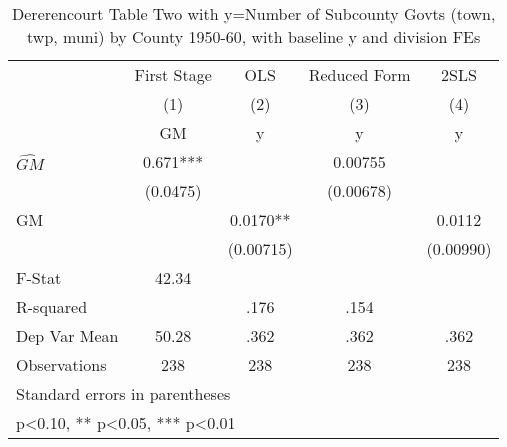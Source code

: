 \begin{table}[htbp]\centering
\def\sym#1{\ifmmode^{#1}\else\(^{#1}\)\fi}
\caption{Dererencourt Table Two with y=Number of Subcounty Govts (town, twp, muni) by County 1950-60, with baseline y and division FEs}
\begin{tabular}{l*{4}{c}}
\toprule
                    & First Stage   &         OLS   &Reduced Form   &        2SLS   \\
                    &\multicolumn{1}{c}{(1)}&\multicolumn{1}{c}{(2)}&\multicolumn{1}{c}{(3)}&\multicolumn{1}{c}{(4)}\\
                    &\multicolumn{1}{c}{GM}&\multicolumn{1}{c}{y}&\multicolumn{1}{c}{y}&\multicolumn{1}{c}{y}\\
\midrule
$\hat{GM}$          &       0.671***&               &     0.00755   &               \\
                    &    (0.0475)   &               &   (0.00678)   &               \\
\addlinespace
GM                  &               &      0.0170** &               &      0.0112   \\
                    &               &   (0.00715)   &               &   (0.00990)   \\
\midrule
F-Stat              &       42.34   &               &               &               \\
R-squared           &               &        .176   &        .154   &               \\
Dep Var Mean        &       50.28   &        .362   &        .362   &        .362   \\
Observations        &         238   &         238   &         238   &         238   \\
\bottomrule
\multicolumn{5}{l}{\footnotesize Standard errors in parentheses}\\
\multicolumn{5}{l}{\footnotesize * p<0.10, ** p<0.05, *** p<0.01}\\
\end{tabular}
\end{table}
